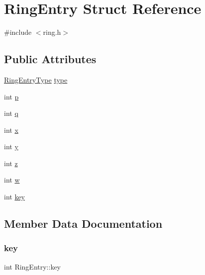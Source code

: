 \hypertarget{structRingEntry}{}\section{Ring\+Entry Struct Reference}
\label{structRingEntry}


{\ttfamily \#include $<$ring.\+h$>$}

\subsection*{Public Attributes}
\begin{DoxyCompactItemize}
\item 
\hyperlink{ring_8h_a0020edd7e28d219c1fcaa2fce15d420d}{Ring\+Entry\+Type} \hyperlink{structRingEntry_afc77cc123c354240feba6e92dd4ee882}{type}
\item 
int \hyperlink{structRingEntry_a8b01eb77bb24ee7243b3c4966475f5d1}{p}
\item 
int \hyperlink{structRingEntry_ae944a4f58e8d867035a9d94366615ff2}{q}
\item 
int \hyperlink{structRingEntry_a1d73e65971815248e917087ca69afd63}{x}
\item 
int \hyperlink{structRingEntry_a7f50629b87d74360c6726903cf1452d2}{y}
\item 
int \hyperlink{structRingEntry_a8b88d0f404a59333eae214698675c712}{z}
\item 
int \hyperlink{structRingEntry_a5c4cd66b932f7f6c430b12b9b6dc4007}{w}
\item 
int \hyperlink{structRingEntry_a94645a5a7b12ad82ed76dce5fd5e1f2c}{key}
\end{DoxyCompactItemize}


\subsection{Member Data Documentation}
\mbox{\label{structRingEntry_a94645a5a7b12ad82ed76dce5fd5e1f2c}} 
\subsubsection{\texorpdfstring{key}{key}}
{\footnotesize\ttfamily int Ring\+Entry\+::key}

\mbox{\label{structRingEntry_a8b01eb77bb24ee7243b3c4966475f5d1}} 
